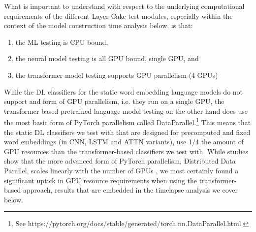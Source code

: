 \documentclass[final]{clv2025}
\begin{document}
What is important to understand with respect to the underlying computational requirements of the different Layer Cake test modules, especially within the context of the model construction time analysis below, is that:
\begin{enumerate}
	\setlength\itemsep{2pt} %
    \item the ML testing is CPU bound,
    \item the neural model testing is all GPU bound, single GPU, and 
    \item the transformer model testing supports GPU parallelism (4 GPUs)
\end{enumerate}

While the DL classifiers for the static word embedding language models do not support and form of GPU parallelism, i.e. they run on a single GPU, the transformer based pretrained language model testing on the other hand does use the most basic form of PyTorch parallelism called  DataParallel.\footnote{See https://pytorch.org/docs/stable/generated/torch.nn.DataParallel.html.} This means that the static DL classifiers we test with that are designed for precomputed and fixed word embeddings (in CNN, LSTM and ATTN variants), use 1/4 the amount of GPU resources than the transformer-based classifiers we test with. While studies show that the more advanced form of PyTorch parallelism, Distributed Data Parallel, scales linearly with the number of GPUs \cite{li2020pytorchdistributedexperiencesaccelerating}, we most certainly found a significant uptick in GPU resource requirements when using the transformer-based approach, results that are embedded in the timelapse analysis we cover below.
\end{document}
